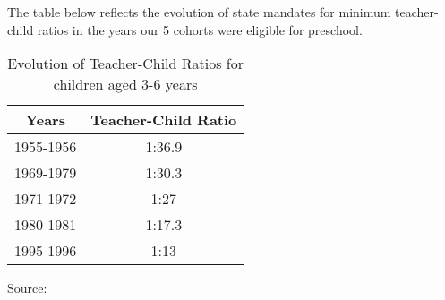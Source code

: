 
The table below reflects the evolution of state mandates for minimum teacher-child ratios in the years our 5 cohorts were eligible for preschool. 

\begin{table}[H]
\begin{center}
\caption{Evolution of Teacher-Child Ratios for children aged 3-6 years}
\label{tab:ratios}
\begin{tabular}{c c}
\toprule
Years & \multicolumn{1}{C{7em}}{Teacher-Child Ratio} \\
\midrule
1955-1956 & 1:36.9 \\
1969-1979 & 1:30.3 \\
1971-1972 & 1:27 \\
1980-1981 & 1:17.3 \\
1995-1996 & 1:13 \\
\bottomrule
\end{tabular}
\end{center}
\small
Source: \citet {Hohnerlein_2015_Development-and-Diffusion}
\end{table}

